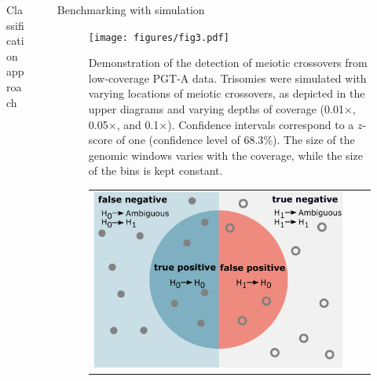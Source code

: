 \documentclass[final]{beamer}
\newlength{\sepwidth}
\newlength{\colwidth}
\newcommand{\separatorcolumn}{\begin{column}{\sepwidth}\end{column}}
\begin{document}
\begin{frame}[t]
\begin{columns}[t]
\begin{column}{\colwidth}
\begin{block}{Classification approach}
  \end{block}
  
\end{column}

\separatorcolumn


\begin{column}{\colwidth}

\begin{block}{Benchmarking with simulation}
\vspace{-15pt}
\begin{figure}

  \texttt{[image: figures/fig3.pdf]}
\caption{Demonstration of the detection of meiotic crossovers from low-coverage PGT-A data. Trisomies were simulated with varying locations of meiotic crossovers, as depicted in the upper diagrams and varying depths of coverage (0.01$\times$, 0.05$\times$, and 0.1$\times$). Confidence intervals correspond to a $z$-score of one (confidence level of $68.3\%$). The size of the genomic windows varies with the coverage, while the size of the bins is kept constant.}
 \end{figure}

\begin{figure}
\centering
\begin{tabular}{ccc}

  \includegraphics[width=0.27\linewidth,align=c]{figures/fig4a.pdf} &


\end{tabular}
\end{figure}
\end{block}
\end{column}
\end{columns}
\end{frame}
\end{document}
